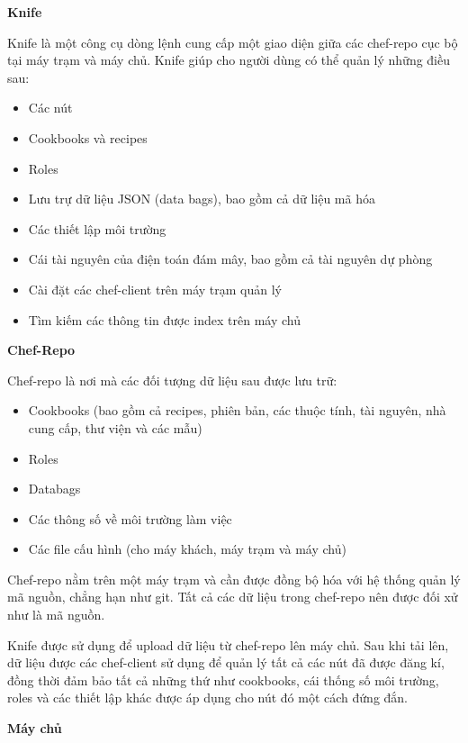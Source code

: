 \textbf{\large Knife}


Knife là một công cụ dòng lệnh cung cấp một giao diện giữa các chef-repo cục bộ tại máy trạm và máy chủ. Knife giúp cho người dùng có thể quản lý những điều sau:

\begin{itemize}
\item Các nút
\item Cookbooks và recipes
\item Roles
\item Lưu trự dữ liệu JSON (data bags), bao gồm cả dữ liệu mã hóa
\item Các thiết lập môi trường
\item Cái tài nguyên của điện toán đám mây, bao gồm cả tài nguyên dự phòng
\item Cài đặt các chef-client trên máy trạm quản lý
\item Tìm kiếm các thông tin được index trên máy chủ
\end{itemize}

\textbf{\large Chef-Repo}


Chef-repo là nơi mà các đối tượng dữ liệu sau được lưu trữ:

\begin{itemize}
\item Cookbooks (bao gồm cả recipes, phiên bản, các thuộc tính, tài nguyên, nhà cung cấp, thư viện và các mẫu)
\item Roles
\item Databags
\item Các thông số về môi trường làm việc
\item Các file cấu hình (cho máy khách, máy trạm và máy chủ)
\end{itemize}

Chef-repo nằm trên một máy trạm và cần được đồng bộ hóa với hệ thống quản lý mã nguồn, chẳng hạn như git. Tất cả các dữ liệu trong chef-repo nên được đối xử như là mã nguồn.

Knife được sử dụng để upload dữ liệu từ chef-repo lên máy chủ. Sau khi tải lên, dữ liệu được các chef-client sử dụng để quản lý tất cả các nút đã được đăng kí, đồng thời đảm bảo tất cả những thứ như cookbooks, cái thống số môi trường, roles và các thiết lập khác được áp dụng cho nút đó một cách đứng đắn.

\newpage
\clearpage

\textbf{\large Máy chủ}



